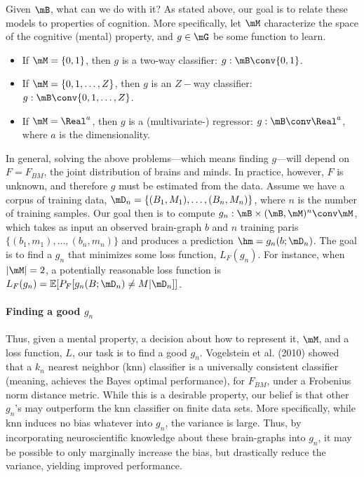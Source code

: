 Given $\mB$, what can we do with it?  As stated above, our goal is to relate these models to properties of cognition. More specifically, let $\mM$ characterize the space of the cognitive (mental) property, and $g \in \mG$ be some function to learn.  

\begin{itemize}
	\item If $\mM=\{0,1\}$, then $g$ is a two-way classifier: $g: \mB \conv \{0,1\}$.
	\item If $\mM=\{0,1,\ldots, Z\}$, then $g$ is an $Z-$way classifier: $g: \mB \conv \{0,1,\ldots,Z\}$.
	\item If $\mM=\Real^a$, then $g$ is a (multivariate-) regressor: $g: \mB \conv \Real^a$, where $a$ is the dimensionality.  
\end{itemize}

In general, solving the above problems---which means finding $g$---will depend on $F=F_{BM}$, the joint distribution of brains and minds.  In practice, however, $F$ is unknown, and therefore $g$ must be estimated from the data. Assume we have a corpus of training data, $\mD_n=\{(B_1,M_1), \ldots, (B_n, M_n)\}$, where $n$ is the number of training samples.  Our goal then is to compute $g_n: \mB \times (\mB, \mM)^n \conv \mM$, which takes as input an observed brain-graph $b$ and $n$ training paris $\{(b_1,m_1), \ldots, (b_n,m_n)\}$ and produces a prediction $\hm=g_n(b; \mD_n)$.  The goal is to find a $g_n$ that minimizes some loss function, $L_F(g_n)$.  For instance, when $|\mM|=2$, a potentially reasonable loss function is $L_F(g_n)=\mathbb{E}[P_F[g_n(B;\mD_n) \neq M | \mD_n]]$.

\paragraph{Finding a good $g_n$}

Thus, given a mental property, a decision about how to represent it, $\mM$, and a loss function, $L$, our task is to find a good $g_n$.  Vogelstein et al. (2010) showed that a $k_n$ nearest neighbor (knn) classifier is a universally consistent classifier (meaning, achieves the Bayes optimal performance), for $F_{BM}$, under a Frobenius norm distance metric.  While this is a desirable property, our belief is that other $g_n$'s may outperform the knn classifier on finite data sets.  More specifically, while knn induces no bias whatever into $g_n$, the variance is large.  Thus, by incorporating neuroscientific knowledge about these brain-graphs into $g_n$, it may be possible to only marginally increase the bias, but drastically reduce the variance, yielding improved performance.  

